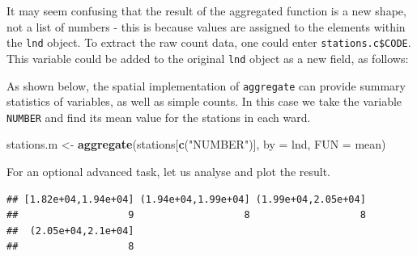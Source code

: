 \documentclass[]{article}
\newenvironment{Shaded}{}{}
\newcommand{\KeywordTok}[1]{\textcolor[rgb]{0.00,0.44,0.13}{\textbf{{#1}}}}
\newcommand{\DataTypeTok}[1]{\textcolor[rgb]{0.56,0.13,0.00}{{#1}}}
\newcommand{\StringTok}[1]{\textcolor[rgb]{0.25,0.44,0.63}{{#1}}}
\newcommand{\NormalTok}[1]{{#1}}
\begin{document}
It may seem confusing that the result of the aggregated function is a
new shape, not a list of numbers - this is because values are assigned
to the elements within the \texttt{lnd} object. To extract the raw count
data, one could enter \texttt{stations.c\$CODE}. This variable could be
added to the original \texttt{lnd} object as a new field, as follows:

\begin{Shaded}
\end{Shaded}

As shown below, the spatial implementation of \texttt{aggregate} can
provide summary statistics of variables, as well as simple counts. In
this case we take the variable \texttt{NUMBER} and find its mean value
for the stations in each ward.

\begin{Shaded}
\begin{Highlighting}[]
\NormalTok{stations.m <-}\StringTok{ }\KeywordTok{aggregate}\NormalTok{(stations[}\KeywordTok{c}\NormalTok{(}\StringTok{"NUMBER"}\NormalTok{)], }\DataTypeTok{by =} \NormalTok{lnd, }\DataTypeTok{FUN =} \NormalTok{mean)}
\end{Highlighting}
\end{Shaded}

For an optional advanced task, let us analyse and plot the result.

\begin{Shaded}
\end{Shaded}

\begin{verbatim}
## [1.82e+04,1.94e+04] (1.94e+04,1.99e+04] (1.99e+04,2.05e+04] 
##                   9                   8                   8 
##  (2.05e+04,2.1e+04] 
##                   8
\end{verbatim}
\end{document}
